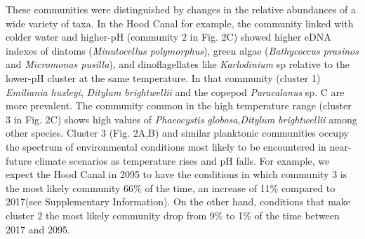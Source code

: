\documentclass[11pt]{article}
\begin{document}
\begin{linenumbers}
These communities were distinguished by changes in the relative abundances of a wide variety of taxa. In the Hood Canal for example, the community linked with colder water and higher-pH (community 2 in Fig. 2C) showed higher eDNA indexes of diatoms (\textit{Minutocellus polymorphus}), green algae  (\textit{Bathycoccus prasinos} and \textit{Micromonas pusilla}), and dinoflagellates like \textit{Karlodinium} sp relative to the lower-pH cluster at the same temperature. In that community (cluster 1) \textit{Emiliania huxleyi}, \textit{Ditylum brightwellii} and the copepod \textit{Paracalanus} sp. C are more prevalent.  The community common in the high temperature range (cluster 3 in Fig. 2C) shows high values of \textit{Phaeocystis globosa},\textit{Ditylum brightwellii} among other species. Cluster 3 (Fig. 2A,B) and similar planktonic communities occupy the spectrum of environmental conditions most likely to be encountered in near-future climate scenarios as temperature rises and pH falls. For example, we expect the Hood Canal in 2095 to have the conditions in which community 3 is the most likely community 66\% of the time, an increase of 11\% compared to 2017(see Supplementary Information). On the other hand, conditions that make cluster 2 the most likely community drop from 9\% to 1\% of the time between 2017 and 2095.





\end{linenumbers}
\end{document}

